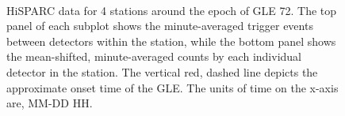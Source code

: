 \begin{figure}[ht!]
	\centering
	 \\
	
	\qquad
	
	
	\caption{HiSPARC data for 4 stations around the epoch of GLE 72. The top panel of each subplot shows the minute-averaged trigger events between detectors within the station, while the bottom panel shows the mean-shifted, minute-averaged counts by each individual detector in the station. The vertical red, dashed line depicts the approximate onset time of the GLE. The units of time on the x-axis are, MM-DD HH.}
	\label{fig:GLE_72}
\end{figure}


